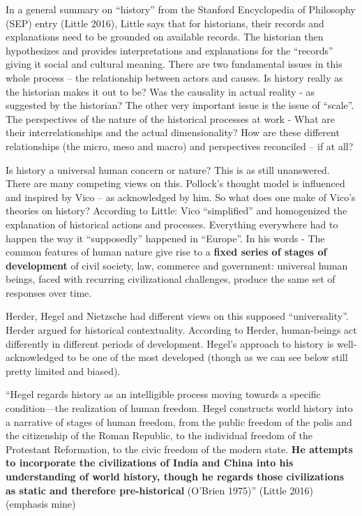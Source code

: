 In a general summary on “history” from the Stanford Encyclopedia of Philosophy (SEP) entry (Little 2016), Little says that for historians, their records and explanations need to be grounded on available records. The historian then hypothesizes and provides interpretations and explanations for the “records” giving it social and cultural meaning. There are two fundamental issues in this whole process – the relationship between actors and causes. Is history really as the historian makes it out to be? Was the causality in actual reality - as suggested by the historian? The other very important issue is the issue of “scale”. The perspectives of the nature of the historical processes at work - What are their interrelationships and the actual dimensionality? How are these different relationships (the micro, meso and macro) and perspectives reconciled – if at all?

Is history a universal human concern or nature? This is as still unanswered. There are many competing views on this. Pollock’s thought model is influenced and inspired by Vico – as acknowledged by him. So what does one make of Vico’s theories on history? According to Little: Vico “simplified” and homogenized the explanation of historical actions and processes. Everything everywhere had to happen the way it “supposedly” happened in “Europe”. In his words - The common features of human nature give rise to a \textbf{fixed series of stages of development} of civil society, law, commerce and government: universal human beings, faced with recurring civilizational challenges, produce the same set of responses over time.

Herder, Hegel and Nietzsche had different views on this supposed “universality”. Herder argued for historical contextuality. According to Herder, human-beings act differently in different periods of development. Hegel's approach to history is well-acknowledged to be one of the most developed (though as we can see below still pretty limited and biased).

\begin{myquote}
“Hegel regards history as an intelligible process moving towards a specific condition—the realization of human freedom. Hegel constructs world history into a narrative of stages of human freedom, from the public freedom of the polis and the citizenship of the Roman Republic, to the individual freedom of the Protestant Reformation, to the civic freedom of the modern state. \textbf{He attempts to incorporate the civilizations of India and China into his understanding of world history, though he regards those civilizations as static and therefore pre-historical} \hfill (O'Brien 1975)” (Little 2016) (emphasis mine)
\end{myquote}

